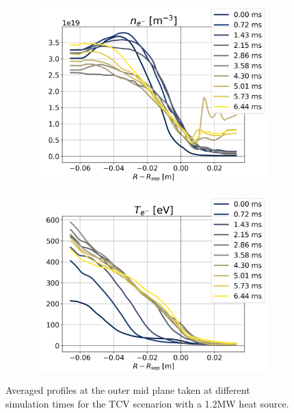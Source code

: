 \begin{figure}[H]\centering
	\begin{subfigure}[t]{0.45\textwidth}
		\centering
		\includegraphics[width=1\textwidth]{schemes/OMP_profiles_e-_n_Hmode.png}
		\label{fig:TCV_highPower_OMPn}
	\end{subfigure}
	\begin{subfigure}[t]{0.45\textwidth}
		\centering
		\includegraphics[width=1\textwidth]{schemes/OMP_profiles_e-_T_Hmode.png}
		\label{fig:TCV_highPower_OMPT}
	\end{subfigure}
	\caption{Averaged profiles at the outer mid plane taken at different simulation times for the TCV scenarion with a 1.2MW heat source.}
	\label{fig:TCV_highPower_OMP}
\end{figure}


